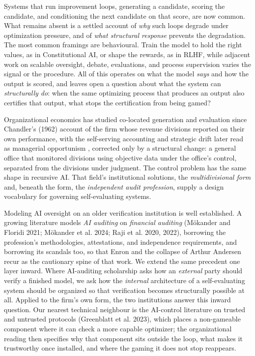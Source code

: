 \documentclass[11pt]{article}
\begin{document}
Systems that run improvement loops, generating a candidate, scoring the candidate, and conditioning the next candidate on that score, are now common. What remains absent is a settled account of \emph{why} such loops degrade under optimization pressure, and of \emph{what structural response} prevents the degradation. The most common framings are behavioural. Train the model to hold the right values, as in Constitutional AI, or shape the rewards, as in RLHF, while adjacent work on scalable oversight, debate, evaluations, and process supervision varies the signal or the procedure. All of this operates on what the model \emph{says} and how the output is scored, and leaves open a question about what the system can \emph{structurally do}: when the same optimizing process that produces an output also certifies that output, what stops the certification from being gamed?

Organizational economics has studied co-located generation and evaluation since Chandler's (1962) account of the firm whose revenue divisions reported on their own performance, with the self-serving accounting and strategic drift later read as managerial opportunism \citep{williamson1975}, corrected only by a structural change: a general office that monitored divisions using objective data under the office's control, separated from the divisions under judgment. The control problem has the same shape in recursive AI. That field's institutional solutions, the \emph{multidivisional form} and, beneath the form, the \emph{independent audit profession}, supply a design vocabulary for governing self-evaluating systems.

Modeling AI oversight on an older verification institution is well established. A growing literature models \emph{AI auditing} on \emph{financial auditing} (Mökander and Floridi 2021; Mökander et al. 2024; Raji et al. 2020, 2022), borrowing the profession's methodologies, attestations, and independence requirements, and borrowing its scandals too, so that Enron and the collapse of Arthur Andersen recur as the cautionary spine of that work. We extend the same precedent one layer inward. Where AI-auditing scholarship asks how an \emph{external} party should verify a finished model, we ask how the \emph{internal} architecture of a self-evaluating system should be organized so that verification becomes structurally possible at all. Applied to the firm's own form, the two institutions answer this inward question. Our nearest technical neighbour is the AI-control literature on trusted and untrusted protocols (Greenblatt et al. 2023), which places a non-gameable component where it can check a more capable optimizer; the organizational reading then specifies why that component sits outside the loop, what makes it trustworthy once installed, and where the gaming it does not stop reappears.
\end{document}
